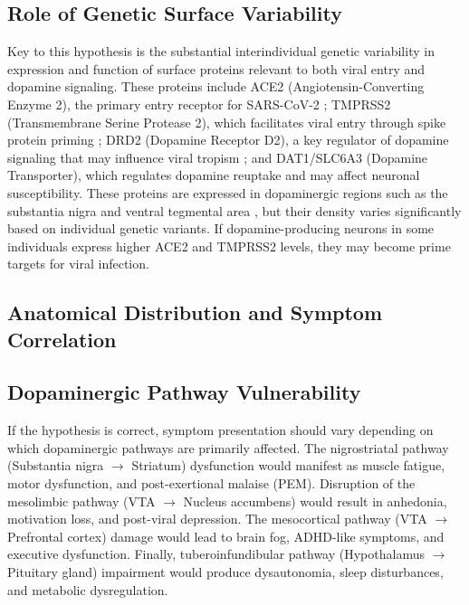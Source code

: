\documentclass[11pt]{article}
\begin{document}
\subsection*{Role of Genetic Surface Variability}
Key to this hypothesis is the substantial interindividual genetic variability in expression and function of surface proteins relevant to both viral entry and dopamine signaling. These proteins include ACE2 (Angiotensin-Converting Enzyme 2), the primary entry receptor for SARS-CoV-2 \citep{cao2020ace2genetics, hou2021ace2variants}; TMPRSS2 (Transmembrane Serine Protease 2), which facilitates viral entry through spike protein priming \citep{asselta2020ace2tmprss2}; DRD2 (Dopamine Receptor D2), a key regulator of dopamine signaling that may influence viral tropism \citep{eisenstein2016drd2}; and DAT1/SLC6A3 (Dopamine Transporter), which regulates dopamine reuptake and may affect neuronal susceptibility. These proteins are expressed in dopaminergic regions such as the substantia nigra and ventral tegmental area \citep{song2021neuroinvasion, douaud2022brain}, but their density varies significantly based on individual genetic variants. If dopamine-producing neurons in some individuals express higher ACE2 and TMPRSS2 levels, they may become prime targets for viral infection.

\begin{center}
\section*{Anatomical Distribution and Symptom Correlation}
\end{center}

\subsection*{Dopaminergic Pathway Vulnerability}
If the hypothesis is correct, symptom presentation should vary depending on which dopaminergic pathways are primarily affected. The nigrostriatal pathway (Substantia nigra $\rightarrow$ Striatum) dysfunction would manifest as muscle fatigue, motor dysfunction, and post-exertional malaise (PEM). Disruption of the mesolimbic pathway (VTA $\rightarrow$ Nucleus accumbens) would result in anhedonia, motivation loss, and post-viral depression. The mesocortical pathway (VTA $\rightarrow$ Prefrontal cortex) damage would lead to brain fog, ADHD-like symptoms, and executive dysfunction. Finally, tuberoinfundibular pathway (Hypothalamus $\rightarrow$ Pituitary gland) impairment would produce dysautonomia, sleep disturbances, and metabolic dysregulation.
\end{document}
